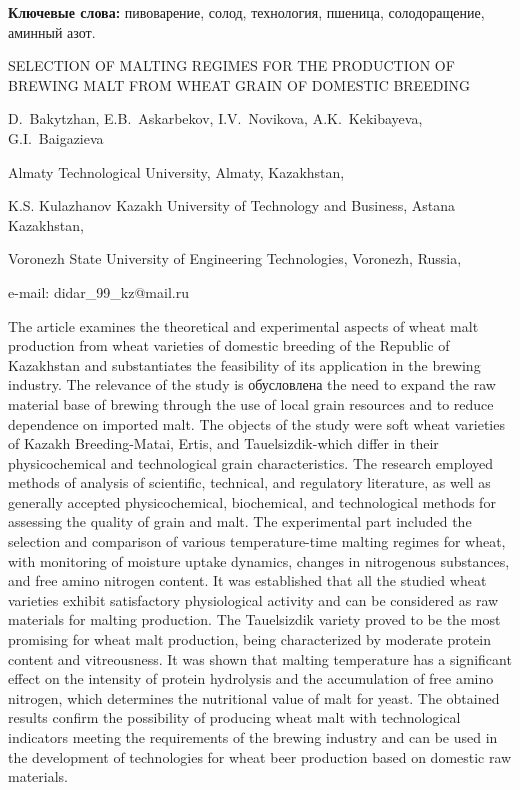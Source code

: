 {\bfseries Ключевые слова:} пивоварение, солод, технология, пшеница,
солодоращение, аминный азот.

\begin{header}
SELECTION OF MALTING REGIMES FOR THE PRODUCTION OF BREWING MALT FROM WHEAT GRAIN OF DOMESTIC BREEDING

D.~Bakytzhan\envelope,
E.B.~Askarbekov,
I.V.~Novikova,
A.K.~Kekibayeva,
G.I.~Baigazieva
\end{header}

\begin{affil}
Almaty Technological University, Almaty, Kazakhstan,

K.S. Kulazhanov Kazakh University of Technology and Business, Astana Kazakhstan,

Voronezh State University of Engineering Technologies, Voronezh, Russia,

e-mail: didar\_99\_kz@mail.ru
\end{affil}

The article examines the theoretical and experimental aspects of wheat
malt production from wheat varieties of domestic breeding of the
Republic of Kazakhstan and substantiates the feasibility of its
application in the brewing industry. The relevance of the study is
обусловлена the need to expand the raw material base of brewing through
the use of local grain resources and to reduce dependence on imported
malt. The objects of the study were soft wheat varieties of Kazakh
Breeding-Matai, Ertis, and Tauelsizdik-which differ in their
physicochemical and technological grain characteristics. The research
employed methods of analysis of scientific, technical, and regulatory
literature, as well as generally accepted physicochemical, biochemical,
and technological methods for assessing the quality of grain and malt.
The experimental part included the selection and comparison of various
temperature-time malting regimes for wheat, with monitoring of moisture
uptake dynamics, changes in nitrogenous substances, and free amino
nitrogen content. It was established that all the studied wheat
varieties exhibit satisfactory physiological activity and can be
considered as raw materials for malting production. The Tauelsizdik
variety proved to be the most promising for wheat malt production, being
characterized by moderate protein content and vitreousness. It was shown
that malting temperature has a significant effect on the intensity of
protein hydrolysis and the accumulation of free amino nitrogen, which
determines the nutri\-tional value of malt for yeast. The obtained results
confirm the possibility of producing wheat malt with techno\-logical
indicators meeting the requirements of the brewing industry and can be
used in the development of technologies for wheat beer production based
on domestic raw materials.

